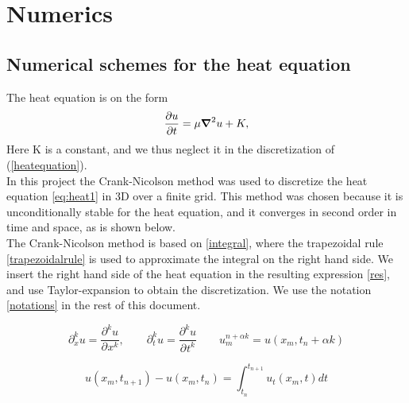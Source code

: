 \chapter{Numerics}

\section{Numerical schemes for the heat equation}

The heat equation is on the form
\begin{equation}
\frac{\partial u}{\partial t}=\mu \mbox{\boldmath$ \nabla $} ^2 u + K,
\label{heatequation}
\end{equation}
Here K is a constant, and we thus neglect it in the discretization of (\ref{heatequation}).\\

In this project the Crank-Nicolson method was used to discretize the heat
equation \cref{eq:heat1} in 3D over a finite grid. This method was chosen because
it is unconditionally stable for the heat equation, and it converges in second order in time and
space, as is shown below. \\

The Crank-Nicolson method is based on \cref{integral}, where the
trapezoidal rule \ref{trapezoidalrule} is used to approximate the integral on
the right hand side. We insert the right hand side of the heat equation in the
resulting expression \ref{res}, and use Taylor-expansion to obtain the
discretization. We use the notation \ref{notations} in the rest of this document.

\begin{equation}
\partial_{x}^{k}u=\frac{\partial^{k}u}{\partial^{}x^{k}},\quad \quad \partial_{t}^{k}u=\frac{\partial^{k}u}{\partial^{}t^{k}} \quad \quad u_{m}^{n+\alpha k } = u(x_{m},t_{n}+\alpha k)
\label{notations}
\end{equation}

\begin{equation}
u(x_m,t_{n+1}) - u(x_m,t_n) = \int_{t_n} ^{t_{n+1}} u_t(x_m,t) dt
\label{integral}
\end{equation}

